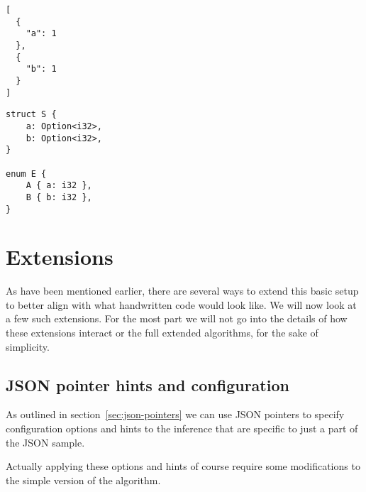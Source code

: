 \begin{listing}[ht!]
\begin{verbatim}
[
  {
    "a": 1
  },
  {
    "b": 1
  }
]
\end{verbatim}
\caption{JSON Dilemma \#1}
\label{lst:json-dilemma-1}
\end{listing}

\begin{listing}[ht!]
\begin{verbatim}
struct S {
    a: Option<i32>,
    b: Option<i32>,
}

enum E {
    A { a: i32 },
    B { b: i32 },
}
\end{verbatim}
\caption{JSON Dilemma \#1 - Two solutions}
\label{lst:json-dilemma-1-rs}
\end{listing}

\section{Extensions}
\label{sec:extensions}

As have been mentioned earlier, there are several ways to extend this basic setup to better align with what handwritten code would look like. We will now look at a few such extensions. For the most part we will not go into the details of how these extensions interact or the full extended algorithms, for the sake of simplicity.



\subsection{JSON pointer hints and configuration}

As outlined in section~\ref{sec:json-pointers} we can use JSON pointers to specify configuration options and hints to the inference that are specific to just a part of the JSON sample.

Actually applying these options and hints of course require some modifications to the simple version of the algorithm.




